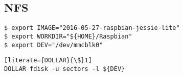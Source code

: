 \label{sec:testbed_nfs}


\subsection{NFS}

\begin{lstlisting}[]
$ export IMAGE="2016-05-27-raspbian-jessie-lite"
$ export WORKDIR="${HOME}/Raspbian"
$ export DEV="/dev/mmcblk0"
\end{lstlisting}
\FloatBarrier
\vspace{-5mm}

\begin{lstlisting}[literate={DOLLAR}{\$}1]
DOLLAR fdisk -u sectors -l ${DEV}
\end{lstlisting}
\FloatBarrier
\vspace{-5mm}

